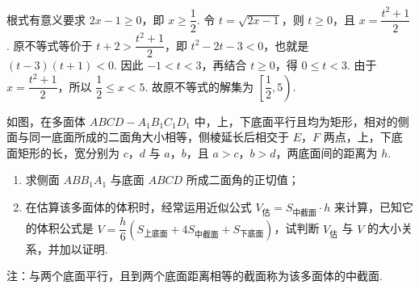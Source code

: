 \begin{solution}
根式有意义要求 \(2x-1\geqslant0\)，即 \(x\geqslant\dfrac{1}{2}\). 令 \(t=\sqrt{2x-1}\)，则 \(t\geqslant0\)，且 \(x=\dfrac{t^2+1}{2}\). 原不等式等价于 \(t+2>\dfrac{t^2+1}{2}\)，即 \(t^2-2t-3<0\)，也就是 \((t-3)(t+1)<0\). 因此 \(-1<t<3\)，再结合 \(t\geqslant0\)，得 \(0\leqslant t<3\). 由于 \(x=\dfrac{t^2+1}{2}\)，所以 \(\dfrac{1}{2}\leqslant x<5\). 故原不等式的解集为 \(\left[\dfrac{1}{2},5\right)\).
\end{solution}

\begin{problem}
如图，在多面体 \(ABCD-A_{1}B_{1}C_{1}D_{1}\) 中，上，下底面平行且均为矩形，相对的侧面与同一底面所成的二面角大小相等，侧棱延长后相交于 \(E\)，\(F\) 两点，上，下底面矩形的长，宽分别为 \(c\)，\(d\) 与 \(a\)，\(b\)，且 \(a>c\)，\(b>d\)，两底面间的距离为 \(h\).

\begin{enumerate}
\item 求侧面 \(ABB_{1}A_{1}\) 与底面 \(ABCD\) 所成二面角的正切值；
\item 在估算该多面体的体积时，经常运用近似公式 \(V_{\text{估}}=S_{\text{中截面}}\cdot h\) 来计算，已知它的体积公式是 \(V=\dfrac{h}{6}(S_{\text{上底面}}+4S_{\text{中截面}}+S_{\text{下底面}})\)，试判断 \(V_{\text{估}}\) 与 \(V\) 的大小关系，并加以证明.
\end{enumerate}

注：与两个底面平行，且到两个底面距离相等的截面称为该多面体的中截面.

\begin{center}
\end{center}
\end{problem}

